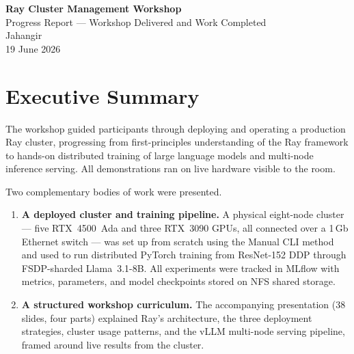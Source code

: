 \documentclass[12pt,a4paper]{article}
\begin{document}
\begin{center}
  {\LARGE\bfseries\color{secblue} Ray Cluster Management Workshop}\\[0.5em]
  {\large Progress Report --- Workshop Delivered and Work Completed}\\[1em]
  {\normalsize Jahangir}\\[0.3em]
  {\normalsize 19 June 2026}
\end{center}

\vspace{0.8em}

\begin{abstract}
This report summarises the Ray Cluster Management Workshop delivered on
16~June~2026 on a live eight-node GPU cluster (268~CPUs, 8~GPUs,
192~GB~VRAM total). The session was structured as four progressive
parts --- Foundations, Deployment, Using the Cluster, and Hands-On
Examples --- and covered the complete workflow with briefing of bare-metal cluster
setup and practical demonstration of matrix multiplications, distributed training of a Llama~3.1-8B model and
multi-node LLM inference serving via vLLM and Ray. The report describes
what was demonstrated, includes diagrams reproduced from the presentation
slides, and records the key performance results obtained on the live
cluster during the session.
\end{abstract}

\tableofcontents
\newpage

\section{Executive Summary}

The workshop guided participants through deploying and operating a
production Ray cluster, progressing from first-principles understanding
of the Ray framework to hands-on distributed training of large language
models and multi-node inference serving. All demonstrations ran on live
hardware visible to the room.

Two complementary bodies of work were presented.

\begin{enumerate}
\item \textbf{A deployed cluster and training pipeline.} A physical
eight-node cluster --- five RTX~4500~Ada and three RTX~3090 GPUs, all
connected over a 1\,Gb Ethernet switch --- was set up from scratch using
the Manual CLI method and used to run distributed PyTorch training from
ResNet-152 DDP through FSDP-sharded Llama~3.1-8B. All experiments were
tracked in MLflow with metrics, parameters, and model checkpoints stored
on NFS shared storage.

\item \textbf{A structured workshop curriculum.} The accompanying
presentation (38 slides, four parts) explained Ray's architecture, the
three deployment strategies, cluster usage patterns, and the vLLM
multi-node serving pipeline, framed around live results from the cluster.
\end{enumerate}
\end{document}
